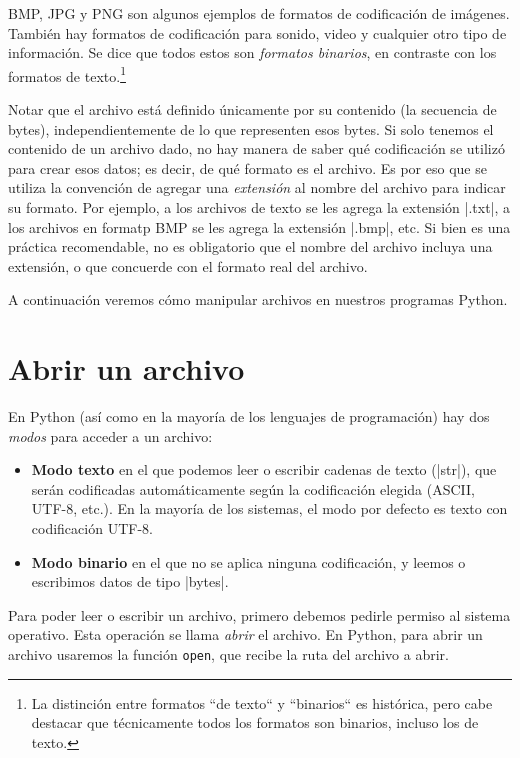 BMP, JPG y PNG son algunos ejemplos de formatos de codificación de imágenes.
También hay formatos de codificación para sonido, video y cualquier otro tipo
de información. Se dice que todos estos son \emph{formatos binarios}, en
contraste con los formatos de texto.\footnote{La distinción entre formatos
``de texto`` y ``binarios`` es histórica, pero cabe destacar que técnicamente
todos los formatos son binarios, incluso los de texto.}

Notar que el archivo está definido únicamente por su contenido (la secuencia de
bytes), independientemente de lo que representen esos bytes. Si solo tenemos el
contenido de un archivo dado, no hay manera de saber qué codificación se
utilizó para crear esos datos; es decir, de qué formato es el archivo. Es por
eso que se utiliza la convención de agregar una \emph{extensión} al nombre del
archivo para indicar su formato. Por ejemplo, a los archivos de texto se les
agrega la extensión |.txt|, a los archivos en formatp BMP se les agrega la
extensión |.bmp|, etc. Si bien es una práctica recomendable, no es obligatorio
que el nombre del archivo incluya una extensión, o que concuerde con el formato
real del archivo.

A continuación veremos cómo manipular archivos en nuestros programas Python.

\section{Abrir un archivo}

En Python (así como en la mayoría de los lenguajes de programación) hay dos
\emph{modos} para acceder a un archivo:

\begin{itemize}
    \item {\bf Modo texto} en el que podemos leer o escribir cadenas de texto (|str|), que
        serán codificadas automáticamente según la codificación elegida (ASCII, UTF-8, etc.).
        En la mayoría de los sistemas, el modo por defecto es texto con codificación UTF-8.
    \item {\bf Modo binario} en el que no se aplica ninguna codificación, y leemos o escribimos
        datos de tipo |bytes|.
\end{itemize}

Para poder leer o escribir un archivo, primero debemos pedirle permiso al
sistema operativo. Esta operación se llama \emph{abrir} el archivo. En Python,
para abrir un archivo usaremos la función \lstinline!open!, que recibe la
ruta del archivo a abrir.

